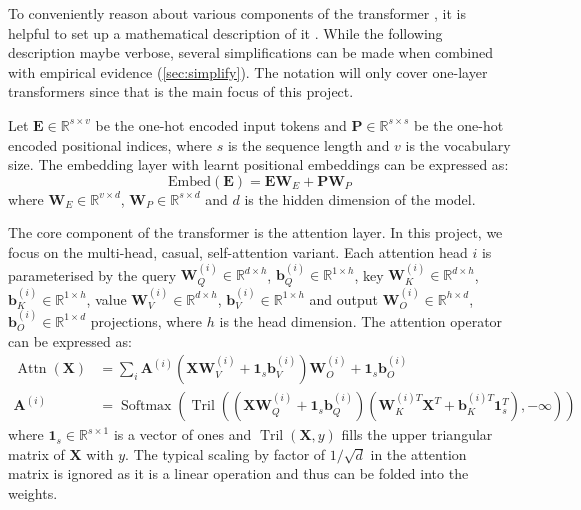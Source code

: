 \documentclass{article}
\renewcommand{\v}[1]{\mathbf{\bm{#1}}}
\newcommand{\m}[1]{\mathbf{\bm{#1}}}
\newcommand{\R}{\mathbb{R}}
\DeclareMathOperator{\softmax}{Softmax}
\DeclareMathOperator{\tril}{Tril}
\DeclareMathOperator{\attn}{Attn}
\begin{document}
To conveniently reason about various components of the transformer \citep{vaswani2017attention}, it is helpful to set up a mathematical description of it \citep{elhage2021mathematical}. While the following description maybe verbose, several simplifications can be made when combined with empirical evidence (\cref{sec:simplify}). The notation will only cover one-layer transformers since that is the main focus of this project.

Let $\m{E} \in \R^{s \times v}$ be the one-hot encoded input tokens and $\m{P} \in \R^{s \times s}$ be the one-hot encoded positional indices, where $s$ is the sequence length and $v$ is the vocabulary size. The embedding layer with learnt positional embeddings can be expressed as:
\begin{equation*}
    \text{Embed}(\m{E}) = \m{E} \m{W}_E + \m{P} \m{W}_P
\end{equation*}
where $\m{W}_E \in \R^{v \times d}$, $\m{W}_P \in \R^{s \times d}$ and $d$ is the hidden dimension of the model.

The core component of the transformer is the attention layer. In this project, we focus on the multi-head, casual, self-attention variant. Each attention head $i$ is parameterised by the query $\m{W}_Q^{(i)} \in \R^{d \times h}$, $\v{b}_Q^{(i)} \in \R^{1 \times h}$, key $\m{W}_K^{(i)} \in \R^{d \times h}$, $\v{b}_K^{(i)} \in \R^{1 \times h}$, value $\m{W}_V^{(i)} \in \R^{d \times h}$, $\v{b}_V^{(i)} \in \R^{1 \times h}$ and output $\m{W}_O^{(i)} \in \R^{h \times d}$, $\v{b}_O^{(i)} \in \R^{1 \times d}$ projections, where $h$ is the head dimension. The attention operator can be expressed as:
\begin{equation*}
    \begin{aligned}
        \attn(\m{X})
         & = \sum_i \m{A}^{(i)} (\m{X} \m{W}_V^{(i)} + \v{1}_s \v{b}_V^{(i)}) \m{W}_O^{(i)} + \v{1}_s \v{b}_O^{(i)} \\
        \m{A}^{(i)}
         & = \softmax\left(
        \tril\left(
        \left(\m{X} \m{W}_Q^{(i)} + \v{1}_s \v{b}_Q^{(i)}\right)
        \left(\m{W}_K^{(i)T} \m{X}^T + \v{b}_K^{(i)T}\v{1}_s^T\right)
        , -\infty\right)
        \right)
    \end{aligned}
\end{equation*}
where $\v{1}_s \in \R^{s \times 1}$ is a vector of ones and $\tril(\m{X}, y)$ fills the upper triangular matrix of $\m{X}$ with $y$. The typical scaling by factor of $1/\sqrt{d}$ in the attention matrix is ignored as it is a linear operation and thus can be folded into the weights.
\end{document}
